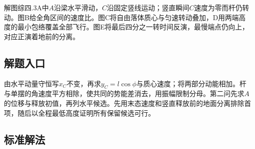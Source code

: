 \documentclass[UTF8,fontset=fandol,a4paper,11pt]{ctexart}
\begin{document}
解图综四.3A中$A$沿梁水平滑动，$C$沿固定竖线运动；竖直瞬间$C$速度为零而杆仍转动。图B给全角区间的速度比。图C将自由落体质心与匀速转动叠加，D用两端高度的最小包络覆盖全部飞行。图E将最后四分之一转时间反演，最慢端点仍向上，对应正演着地前的分离。



\subsection*{解题入口}

由水平动量守恒写$x_C$不变，再求$y_C=l\cos\phi$与质心速度；将两部分动能相加。杆与单摆的角速度平方相除，使共同的势能差消去，用振幅限制分母。第二问先求$A$的位移与释放初值，再列水平候选。先用末态速度和竖直释放前的地面分离排除首项，随后以全程最低高度证明所有保留候选可行。



\subsection*{标准解法}
\end{document}
